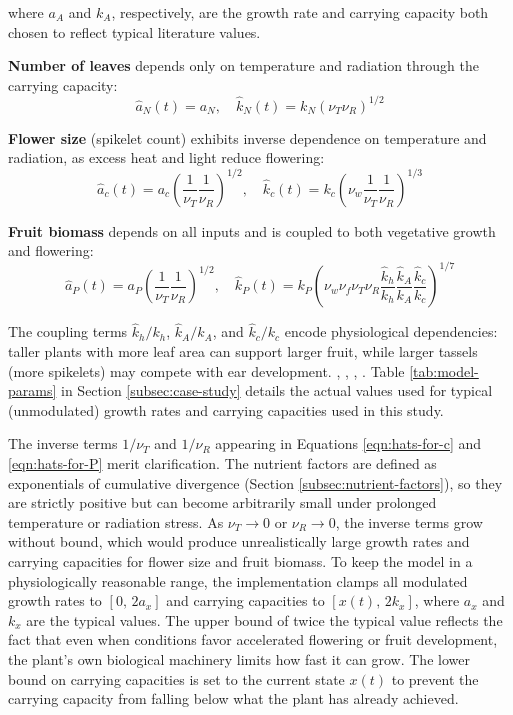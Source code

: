 \documentclass[pdflatex,sn-mathphys-num]{sn-jnl}
\newcommand{\df}[2]{\displaystyle\frac{#1}{#2}}
\begin{document}
\noindent where $a_{A}$ and $k_{A}$, respectively, are the growth rate and carrying capacity both chosen to reflect typical literature values.

\textbf{Number of leaves} depends only on temperature and radiation through the carrying capacity:
\begin{equation}
\hat{a}_{N}(t) = a_{N}, \quad \hat{k}_{N}(t) = k_{N}(\nu_{T}\nu_{R})^{1/2}
\label{eqn:hats-for-N}
\end{equation}

\textbf{Flower size} (spikelet count) exhibits inverse dependence on temperature and radiation, as excess heat and light reduce flowering:
\begin{equation}
\hat{a}_{c}(t) = a_{c}\left(\df{1}{\nu_{T}}\df{1}{\nu_{R}}\right)^{1/2}, \quad \hat{k}_{c}(t) = k_{c}\left(\nu_{w}\df{1}{\nu_{T}}\df{1}{\nu_{R}}\right)^{1/3}
\label{eqn:hats-for-c}
\end{equation}

\textbf{Fruit biomass} depends on all inputs and is coupled to both vegetative growth and flowering:
\begin{equation}
\hat{a}_{P}(t) = a_{P}\left(\df{1}{\nu_{T}}\df{1}{\nu_{R}}\right)^{1/2}, \quad \hat{k}_{P}(t) = k_{P}\left(\nu_{w}\nu_{f}\nu_{T}\nu_{R}\df{\hat{k}_{h}}{k_{h}}\df{\hat{k}_{A}}{k_{A}}\df{\hat{k}_{c}}{k_{c}}\right)^{1/7}
\label{eqn:hats-for-P}
\end{equation}

The coupling terms $\hat{k}_{h}/k_{h}$, $\hat{k}_{A}/k_{A}$, and $\hat{k}_{c}/k_{c}$ encode physiological dependencies: taller plants with more leaf area can support larger fruit, while larger tassels (more spikelets) may compete with ear development. \cite{ren2022agronomic_traits_climate_maize_yield}, \cite{stubbs2023plant_height_maize_lodging}, \cite{wang2022maize_tassel_anther_pollen_genetics}, \cite{silveira2024adaptability_maize_tassel_yield}. Table \ref{tab:model-params} in Section \ref{subsec:case-study} details the actual values used for typical (unmodulated) growth rates and carrying capacities used in this study.

The inverse terms $1/\nu_T$ and $1/\nu_R$ appearing in Equations \ref{eqn:hats-for-c} and \ref{eqn:hats-for-P} merit clarification. The nutrient factors are defined as exponentials of cumulative divergence (Section \ref{subsec:nutrient-factors}), so they are strictly positive but can become arbitrarily small under prolonged temperature or radiation stress. As $\nu_T \to 0$ or $\nu_R \to 0$, the inverse terms grow without bound, which would produce unrealistically large growth rates and carrying capacities for flower size and fruit biomass. To keep the model in a physiologically reasonable range, the implementation clamps all modulated growth rates to $[0,\, 2a_x]$ and carrying capacities to $[x(t),\, 2k_x]$, where $a_x$ and $k_x$ are the typical values. The upper bound of twice the typical value reflects the fact that even when conditions favor accelerated flowering or fruit development, the plant's own biological machinery limits how fast it can grow. The lower bound on carrying capacities is set to the current state $x(t)$ to prevent the carrying capacity from falling below what the plant has already achieved.
\end{document}
